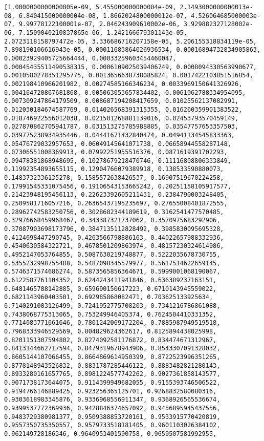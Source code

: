 \documentclass[11pt]{article}
\begin{document}
    \begin{Verbatim}[commandchars=\\\{\}]
[1.0000000000000005e-09, 5.455000000000004e-09, 2.1493000000000013e-08, 6.840415000000004e-08, 1.8662024800000012e-07, 4.526064685000003e-07, 9.99778122100001e-07, 2.046243909610002e-06, 3.929882327128002e-06, 7.1509040210837865e-06, 1.242166679301143e-05, 2.0723118158797472e-05, 3.336686716207158e-05, 5.206155318834119e-05, 7.898190106616943e-05, 0.00011683864026936534, 0.00016894732834905863, 0.00023929405725664444, 0.00033259603454460047, 0.00045435511490538315, 0.0006109025039406749, 0.0008094330563990677, 0.0010580278351295775, 0.0013656638738085824, 0.0017422103851516854, 0.002198410966201982, 0.00274585166346234, 0.0033969150641326926, 0.004164720867681868, 0.005063053657834402, 0.0061062788334954095, 0.007309247864179509, 0.008687194208417659, 0.01025562137082991, 0.012030184674587769, 0.014026568391315355, 0.016260359901383522, 0.018746922556012038, 0.021501268881139016, 0.02453793570459149, 0.027870862705941787, 0.031513275785988885, 0.03547757653357503, 0.039775238934935446, 0.04441671432840474, 0.04941134545833363, 0.05476729032957653, 0.06049145641071738, 0.06658944558287148, 0.07306551008369913, 0.07992251955516376, 0.0871619391702293, 0.09478381868948695, 0.10278679218470746, 0.11116808806333849, 0.11992354893655115, 0.12904766079389918, 0.138533590880073, 0.1483732336135278, 0.1585572638426537, 0.16907519670224258, 0.17991545331075456, 0.19106543153665242, 0.20251158105917577, 0.21423948195456113, 0.22623392605211431, 0.2384790003248405, 0.2509581716057216, 0.26365437195235697, 0.27655008401872555, 0.28962742583250756, 0.3028682344189619, 0.3162541477570485, 0.32976668459968467, 0.343387321737062, 0.3570975683292906, 0.37087903698173796, 0.3847135112828492, 0.3985830095695328, 0.4124698447290745, 0.4263566798886163, 0.44022657988332936, 0.4540630584322721, 0.4678501209863974, 0.48157230324614986, 0.4952147053764855, 0.5087630219748877, 0.5222035678730755, 0.5355232998755488, 0.5487098345579977, 0.5617514622659145, 0.5746371574686274, 0.5873565856364671, 0.5999001068190067, 0.6122587761104352, 0.6244243411941846, 0.636389237163151, 0.6481465788142885, 0.659690150617223, 0.6710143945559022, 0.6821143960403501, 0.692985868082471, 0.703625133925634, 0.7140291083126499, 0.7241952775708203, 0.7341216786861088, 0.7438068775313065, 0.753249946405374, 0.7624504410331352, 0.7714083771661646, 0.7801242069172204, 0.7885987949519518, 0.7968333946529569, 0.804829624362617, 0.8125894438025998, 0.8201151307594802, 0.8274092581176872, 0.834474671312967, 0.8413144662717594, 0.8479319678943906, 0.8543307091328032, 0.8605144107066455, 0.8664869614950399, 0.8722523996351265, 0.8778148943526832, 0.8831787285446122, 0.8883482821280143, 0.8933280161657765, 0.8981224577742262, 0.9027361858143577, 0.9071738173644075, 0.9114399949682055, 0.9155393746506522, 0.9194766146889425, 0.923256365125701, 0.9268832580080316, 0.9303618983345876, 0.9336968556911347, 0.9368926565536674, 0.9399537772369936, 0.9428846374657092, 0.9456895945437556, 0.9483729380981377, 0.9509388853720161, 0.9533915770420819, 0.9557350735350557, 0.9579733518181405, 0.9601103026384102, 0.962149728186346, 0.9640953401590758, 0.9659507581992955, 
\end{Verbatim}
\end{document}
